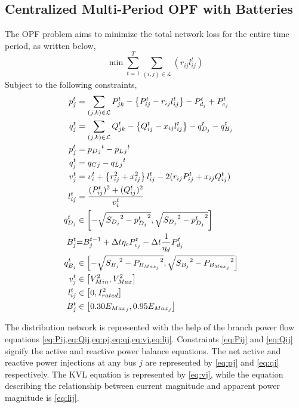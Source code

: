 \documentclass{article}
\begin{document}
\subsection{Centralized Multi-Period OPF with Batteries}
The OPF problem aims to minimize the total network loss for the entire time period, as written below,
\begin{equation}
    \min {\sum_{t = 1}^{T} \sum_{(i, j) \in \mathcal{L}} (r_{ij}l_{ij}^t)}
\end{equation}
Subject to the following constraints,
\begin{align}
    {p_j^t} & = {\sum_{(j, k) \in \mathcal{L}} P_{jk}^t - \left\{P_{ij}^t - r_{ij}l_{ij}^t\right\} - P_{d_j}^t + P_{c_j}^t} && \label{eq:Pij} \\ 
    {q_j^t} & = {\sum_{(j, k) \in \mathcal{L}} Q_{jk}^t - \left\{Q_{ij}^t - x_{ij}l_{ij}^t\right\} - q_{D_j}^t - q_{B_j}^t} && \label{eq:Qij} \\ 
    {p_j^t} &= {p_D{_j}^t - p_L{_j}^t} \label{eq:pj}\\
    {q_j^t} &= {q_C{_j} -q_L{_j}^t} \label{eq:qj}\\
    {v_j^t} & = {v_{i}^t +  \left\{r_{ij}^2 + x_{ij}^2\right\}l_{ij}^t - 2(r_{ij}P_{ij}^t + x_{ij}Q_{ij}^t)} \label{eq:vj} && \\
    {l_{ij}^t} & = {\frac{(P_{ij}^{t})^2 + (Q_{ij}^{t})^2}{v_i^t}} \label{eq:lij} && \\
    { q^{t}_{D_{j}} } 
    &\in
    { \left[-\sqrt{ {S_{D_{j}}}^2 - {p^{t}_{D_{j}}}^2}, \sqrt{ {S_{D_{j}}}^2 - {p^{t}_{D_{j}}}^2}\right] } \label{eq:qDj} && \\
    {\color{darkgreen}{ B_{j}^{t} }} &\color{darkgreen}{=} { \color{darkgreen}{ B_{j}^{t-1} + \Delta t  \eta_c P_{c_j}^t - \Delta t\frac{1}{\eta_d} P_{d_j}^t } } && \\
    { q^{t}_{B_{j}} } 
    &\in 
    { \left[-\sqrt{ {S_{B_{j}}}^2 - {P_{B_{Max_{j}}}}^2}, \sqrt{ {S_{B_{j}}}^2 - {P_{B_{Max_{j}}}}^2}\right] } \label{eq:qBj} && \\
    { v^{t}_{j} } &\in { \left[ V^{2}_{Min}, V^{2}_{Max} \right]} \label{eq:lim_vj} && \\
    { l^{t}_{ij} } &\in { \left[ 0, I^{2}_{rated}
    \right] } \label{eq:lim_lij} && \\
    { B^{t}_{j} } &\in { \left[ 0.30E_{Max_{j}}, 0.95E_{Max_{j}} \right] } \label{eq:lim_Bj} &&
\end{align}

The distribution network is represented with the help of the branch power flow equations \cref{eq:Pij,eq:Qij,eq:pj,eq:qj,eq:vj,eq:lij}. Constraints \cref{eq:Pij} and \cref{eq:Qij} signify the active and reactive power balance equations. The net active and reactive power injections at any bus \(j\) are represented by \cref{eq:pj} and \cref{eq:qj} respectively. The KVL equation is represented by \cref{eq:vj}, while the equation describing the relationship between current magnitude and apparent power magnitude is \cref{eq:lij}.  
\end{document}
